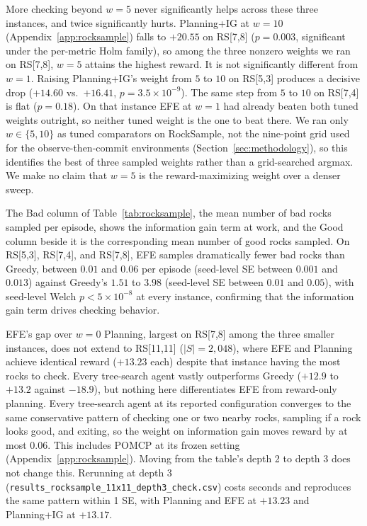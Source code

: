 More checking beyond $w{=}5$ never significantly helps across these three instances, and twice significantly hurts. Planning+IG at $w{=}10$ (Appendix~\ref{app:rocksample}) falls to $+20.55$ on RS[7,8] ($p{=}0.003$, significant under the per-metric Holm family), so among the three nonzero weights we ran on RS[7,8], $w{=}5$ attains the highest reward. It is not significantly different from $w{=}1$. Raising Planning+IG's weight from $5$ to $10$ on RS[5,3] produces a decisive drop ($+14.60$ vs.\ $+16.41$, $p{=}3.5{\times}10^{-9}$). The same step from $5$ to $10$ on RS[7,4] is flat ($p{=}0.18$). On that instance EFE at $w{=}1$ had already beaten both tuned weights outright, so neither tuned weight is the one to beat there. We ran only $w \in \{5, 10\}$ as tuned comparators on RockSample, not the nine-point grid used for the observe-then-commit environments (Section~\ref{sec:methodology}), so this identifies the best of three sampled weights rather than a grid-searched argmax. We make no claim that $w{=}5$ is the reward-maximizing weight over a denser sweep.

The Bad column of Table~\ref{tab:rocksample}, the mean number of bad rocks sampled per episode, shows the information gain term at work, and the Good column beside it is the corresponding mean number of good rocks sampled. On RS[5,3], RS[7,4], and RS[7,8], EFE samples dramatically fewer bad rocks than Greedy, between $0.01$ and $0.06$ per episode (seed-level SE between $0.001$ and $0.013$) against Greedy's $1.51$ to $3.98$ (seed-level SE between $0.01$ and $0.05$), with seed-level Welch $p<5{\times}10^{-8}$ at every instance, confirming that the information gain term drives checking behavior.

EFE's gap over $w{=}0$ Planning, largest on RS[7,8] among the three smaller instances, does not extend to RS[11,11] ($|S|{=}2{,}048$), where EFE and Planning achieve identical reward ($+13.23$ each) despite that instance having the most rocks to check. Every tree-search agent vastly outperforms Greedy ($+12.9$ to $+13.2$ against $-18.9$), but nothing here differentiates EFE from reward-only planning. Every tree-search agent at its reported configuration converges to the same conservative pattern of checking one or two nearby rocks, sampling if a rock looks good, and exiting, so the weight on information gain moves reward by at most $0.06$. This includes POMCP at its frozen setting (Appendix~\ref{app:rocksample}). Moving from the table's depth 2 to depth 3 does not change this. Rerunning at depth 3 (\texttt{results\_\allowbreak rocksample\_\allowbreak 11x11\_\allowbreak depth3\_\allowbreak check.csv}) costs seconds and reproduces the same pattern within 1 SE, with Planning and EFE at $+13.23$ and Planning+IG at $+13.17$.

